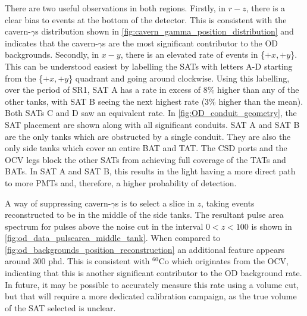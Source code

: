 

\par
There are two useful observations in both regions.
Firstly, in $r-z$, there is a clear bias to events at the bottom of the detector.
This is consistent with the cavern-$\gamma$s distribution shown in \autoref{fig:cavern_gamma_position_distribution} and indicates that the cavern-$\gamma$s are the most significant contributor to the OD backgrounds.
Secondly, in $x-y$, there is an elevated rate of events in \{$+x,+y$\}.
This can be understood easiest by labelling the SATs with letters A-D starting from the \{$+x,+y$\} quadrant and going around clockwise.
Using this labelling, over the period of SR1, SAT A has a rate in excess of 8\% higher than any of the other tanks, with SAT B seeing the next highest rate (3\% higher than the mean).
Both SATs C and D saw an equivalent rate.
In \autoref{fig:OD_conduit_geometry}, the SAT placement are shown along with all significant conduits.
SAT A and SAT B are the only tanks which are obstructed by a single conduit.
They are also the only side tanks which cover an entire BAT and TAT.
The CSD ports and the OCV legs block the other SATs from achieving full coverage of the TATs and BATs.
In SAT A and SAT B, this results in the light having a more direct path to more PMTs and, therefore, a higher probability of detection.
\par
A way of suppressing cavern-$\gamma$s is to select a slice in $z$, taking events reconstructed to be in the middle of the side tanks.
The resultant pulse area spectrum for pulses above the noise cut in the interval $0<z<100$ is shown in \autoref{fig:od_data_pulsearea_middle_tank}.
When compared to \autoref{fig:od_backgrounds_position_reconstruction} an additional feature appears around 300 phd.
This is consistent with ${}^{60}$Co which originates from the OCV, indicating that this is another significant contributor to the OD background rate.
In future, it may be possible to accurately measure this rate using a volume cut, but that will require a more dedicated calibration campaign, as the true volume of the SAT selected is unclear.

